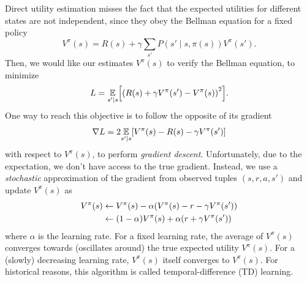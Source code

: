 \documentclass[11pt, a4paper]{exam}
\begin{document}
\begin{exercises}
\begin{parts}
    \begin{solution}
        Direct utility estimation misses the fact that the expected utilities for different states are not independent, since they obey the Bellman equation for a fixed policy
        \begin{equation*}
            V^\pi(s) = R(s) + \gamma \sum_{s'} P(s' \mid s, \pi(s)) V^\pi(s').
        \end{equation*}
        Then, we would like our estimates $V^\pi(s)$ to verify the Bellman equation, \ie{} to minimize
        \begin{equation*}
            L = \underset{s' \mid s}{\E} \sbk*{\rbk*{R(s) + \gamma V^\pi(s') - V^\pi(s)}^2} .
        \end{equation*}
        One way to reach this objective is to follow the opposite of its gradient
        \begin{equation*}
            \nabla L = 2 \underset{s' \mid s}{\E} \sbk*{V^\pi(s) - R(s) - \gamma V^\pi(s')}
        \end{equation*}
        with respect to $V^\pi(s)$, \ie{} to perform \emph{gradient descent}. Unfortunately, due to the expectation, we don't have access to the true gradient. Instead, we use a \emph{stochastic} approximation of the gradient from observed tuples $(s, r, a, s')$ and update $V^\pi(s)$ as
        \begin{align*}
            V^\pi(s) & \leftarrow V^\pi(s) - \alpha \rbk*{V^\pi(s) - r - \gamma V^\pi(s')} \\
            & \leftarrow (1 - \alpha) V^\pi(s) + \alpha \rbk*{r + \gamma V^\pi(s')}
        \end{align*}
        where $\alpha$ is the learning rate. For a fixed learning rate, the average of $V^\pi(s)$ converges towards (oscillates around) the true expected utility $V^\pi(s)$. For a (slowly) decreasing learning rate, $V^\pi(s)$ itself converges to $V^\pi(s)$. For historical reasons, this algorithm is called temporal-difference (TD) learning.



\end{solution}
\end{parts}
\end{exercises}
\end{document}
